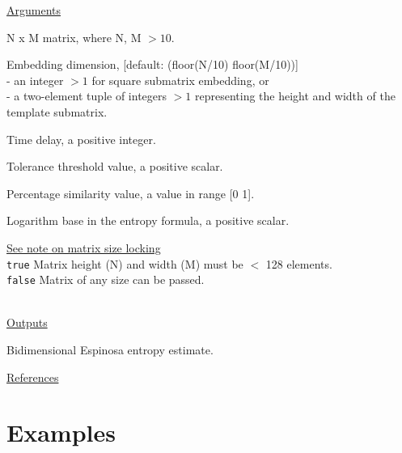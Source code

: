 \documentclass[12pt, a4paper, titlepage, openany]{book}
\newcommand\chapterimage[2][]{%
  \AddToShipoutPictureBG*{%
    \AtTextUpperLeft{%
     \hspace*{\textwidth}%
      \llap{%
            \texttt{[image: \#2]}}}}}%
\begin{document}
\noindent \ul{Arguments}
\begin{description}[labelsep=1cm, labelwidth=2cm, nosep,,style=multiline,leftmargin=3cm]\footnotesize
\item[\texttt{Mat}]		N x M matrix,  where N, M $> 10$.
\item[\texttt{m}]		Embedding dimension, [default: (floor(N/10) floor(M/10))]\\
						- an integer $> 1$ for square submatrix embedding, or\\
						- a two-element tuple of integers $> 1$ representing the height and width of the template submatrix.
\item[\texttt{tau}]		Time delay, a positive integer.
\item[\texttt{r}]		Tolerance threshold value, a positive scalar.
\item[\texttt{ps}]		Percentage similarity value, a value in range [0 1].
\item[\texttt{Logx}]	Logarithm base in the entropy formula, a positive scalar.
\item[\texttt{Lock}]	\hyperlink{bidinote}{\ul{See note on matrix size locking}}\\
					\texttt{true} \hspace{15pt} Matrix height (N) and width (M) must be $<$ 128 elements.\\
					\texttt{false}\hspace{12pt} Matrix of any size can be passed.\\ \
\end{description}

\noindent \ul{Outputs}
\begin{description}[labelsep=1cm, labelwidth=2cm, nosep, style=multiline,leftmargin=3cm]\footnotesize
\item[\texttt{Esp2D}]		Bidimensional Espinosa entropy estimate.
\end{description}

\noindent \ul{References}\hspace{1cm}
\cite{Esp2D1}











\newpage
\chapter{\textbf{Examples}}
\chapterimage[width=16cm, height=3cm]{Chapter Banner2.png}
\vspace{45mm}
\end{document}
